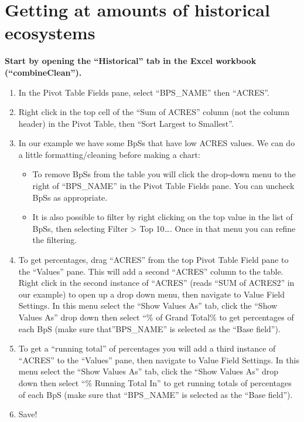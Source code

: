 \documentclass[
]{book}
\providecommand{\tightlist}{%
  \setlength{\itemsep}{0pt}\setlength{\parskip}{0pt}}
\begin{document}
\hypertarget{getting-at-amounts-of-historical-ecosystems}{%
\section{Getting at amounts of historical ecosystems}\label{getting-at-amounts-of-historical-ecosystems}}

\textbf{Start by opening the ``Historical'' tab in the Excel workbook (``combineClean'').}

\begin{enumerate}
\def\labelenumi{\arabic{enumi}.}
\tightlist
\item
  In the Pivot Table Fields pane, select ``BPS\_NAME'' then ``ACRES''.\\
\item
  Right click in the top cell of the ``Sum of ACRES'' column (not the column header) in the Pivot Table, then ``Sort Largest to Smallest''.
\item
  In our example we have some BpSs that have low ACRES values. We can do a little formatting/cleaning before making a chart:

  \begin{itemize}
  \tightlist
  \item
    To remove BpSs from the table you will click the drop-down menu to the right of ``BPS\_NAME'' in the Pivot Table Fields pane. You can uncheck BpSs as appropriate.
  \item
    It is also possible to filter by right clicking on the top value in the list of BpSs, then selecting Filter \textgreater{} Top 10\ldots. Once in that menu you can refine the filtering.
  \end{itemize}
\item
  To get percentages, drag ``ACRES'' from the top Pivot Table Field pane to the ``Values'' pane. This will add a second ``ACRES'' column to the table. Right click in the second instance of ``ACRES'' (reads ``SUM of ACRES2'' in our example) to open up a drop down menu, then navigate to Value Field Settings. In this menu select the ``Show Values As'' tab, click the ``Show Values As'' drop down then select ``\% of Grand Total\% to get percentages of each BpS (make sure that''BPS\_NAME'' is selected as the ``Base field'').\\
\item
  To get a ``running total'' of percentages you will add a third instance of ``ACRES'' to the ``Values'' pane, then navigate to Value Field Settings. In this menu select the ``Show Values As'' tab, click the ``Show Values As'' drop down then select ``\% Running Total In'' to get running totals of percentages of each BpS (make sure that ``BPS\_NAME'' is selected as the ``Base field'').
\item
  Save!
\end{enumerate}
\end{document}
